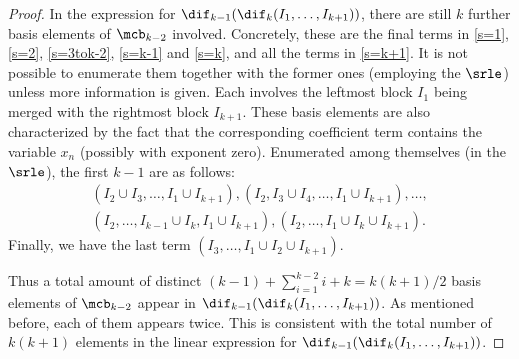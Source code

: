 \begin{proof}
In the expression for $\dif_{k-1}(\dif_{k}(I_1,\ldots,I_{k+1}))$,
there are still $k$ further basis elements of $\mcb_{k-2}$
involved. Concretely, these are the final terms in \eqref{s=1},
\eqref{s=2}, \eqref{s=3tok-2}, \eqref{s=k-1} and \eqref{s=k}, and all
the terms in \eqref{s=k+1}. It is not possible to enumerate them
together with the former ones (employing the $\srle$) unless more
information is given. Each involves the leftmost block $I_1$ being
merged with the rightmost block $I_{k+1}$. These basis elements are
also characterized by the fact that the corresponding coefficient term
contains the variable $x_n$ (possibly with exponent zero). Enumerated
among themselves (in the $\srle$), the first $k-1$ are as follows:
\begin{multline*}
(I_2\cup I_3,\ldots ,I_1\cup I_{k+1}),(I_2,I_3\cup I_4,\ldots ,I_1\cup
  I_{k+1}),\ldots ,\\(I_2,\ldots ,I_{k-1}\cup I_k,I_1\cup I_{k+1}),
  (I_2,\ldots ,I_1\cup I_k\cup I_{k+1}).
\end{multline*}
Finally, we have the last term $(I_3,\ldots ,I_1\cup I_2\cup
I_{k+1})$.

Thus a total amount of distinct $(k-1)+\sum_{i=1}^{k-2}i+k=k(k+1)/2$
basis elements of $\mcb_{k-2}$ appear in
$\dif_{k-1}(\dif_{k}(I_1,\ldots,I_{k+1}))$. As mentioned before, each
of them appears twice. This is consistent with the total number of
$k(k+1)$ elements in the linear expression for
$\dif_{k-1}(\dif_{k}(I_1,\ldots,I_{k+1}))$.


\end{proof}
